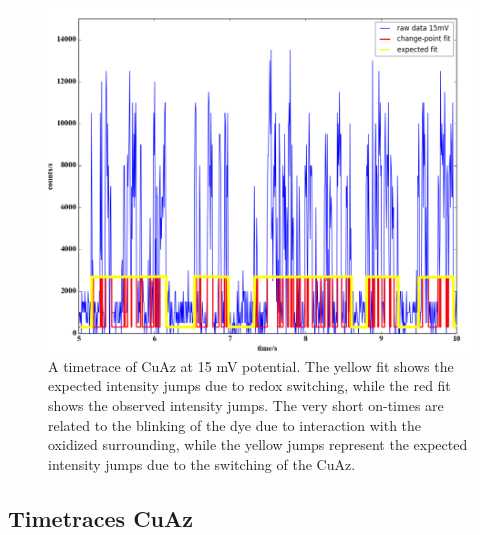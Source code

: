 \documentclass[twoside,single]{lion-msc}
\begin{document}
\begin{figure}[ht!]
\centering
\includegraphics[width=\textwidth]{expected_fits}
\caption{A timetrace of CuAz at 15 mV potential. The yellow fit shows the expected intensity jumps due to redox switching, while the red fit shows the observed intensity jumps. The very short on-times are related to the blinking of the dye due to interaction with the oxidized surrounding, while the yellow jumps represent the expected intensity jumps due to the switching of the CuAz.}
\label{expected_fit}
\end{figure}

\subsection{Timetraces CuAz}
\end{document}

